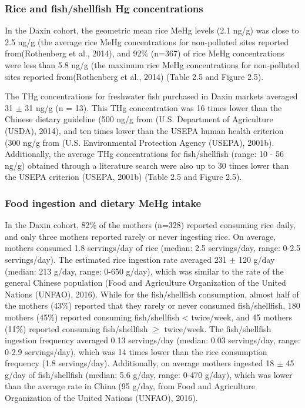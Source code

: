 \subsubsection{Rice and fish/shellfish Hg concentrations}

In the Daxin cohort, the geometric mean rice MeHg levels (2.1 ng/g) was close to 2.5 ng/g (the average rice MeHg concentrations for non-polluted sites reported from(Rothenberg et al., 2014), and 92\% (n=367) of rice MeHg concentrations were less than 5.8 ng/g (the maximum rice MeHg concentrations for non-polluted sites reported from(Rothenberg et al., 2014) (Table 2.5 and Figure 2.5).

The THg concentrations for freshwater fish purchased in Daxin markets averaged 31 \({\pm}\) 31 ng/g (n = 13). This THg concentration was 16 times lower than the Chinese dietary guideline (500 ng/g from (U.S. Department of Agriculture (USDA), 2014), and ten times lower than the USEPA human health criterion (300 ng/g from (U.S. Environmental Protection Agency (USEPA), 2001b). Additionally, the average THg concentrations for fish/shellfish (range: 10 - 56 ng/g) obtained through a literature search were also up to 30 times lower than the USEPA criterion (USEPA, 2001b) (Table 2.5 and Figure 2.5). 

\subsubsection{Food ingestion and dietary MeHg intake}

In the Daxin cohort, 82\% of the mothers (n=328) reported consuming rice daily, and only three mothers reported rarely or never ingesting rice. On average, mothers consumed 1.8 servings/day of rice (median: 2.5 servings/day, range: 0-2.5 servings/day). The estimated rice ingestion rate averaged 231 \({\pm}\) 120 g/day (median: 213 g/day, range: 0-650 g/day), which was similar to the rate of the general Chinese population (Food and Agriculture Organization of the United Nations (UNFAO), 2016). While for the fish/shellfish consumption, almost half of the mothers (43\%) reported that they rarely or never consumed fish/shellfish, 180 mothers (45\%) reported consuming fish/shellfish < twice/week, and 45 mothers (11\%) reported consuming fish/shellfish ${\ge}$ twice/week. The fish/shellfish ingestion frequency averaged 0.13 servings/day (median: 0.03 servings/day, range: 0-2.9 servings/day), which was 14 times lower than the rice consumption frequency (1.8 servings/day). Additionally, on average mothers ingested 18 \({\pm}\) 45 g/day of fish/shellfish (median: 5.6 g/day, range: 0-470 g/day), which was lower than the average rate in China (95 g/day, from Food and Agriculture Organization of the United Nations (UNFAO), 2016). 

